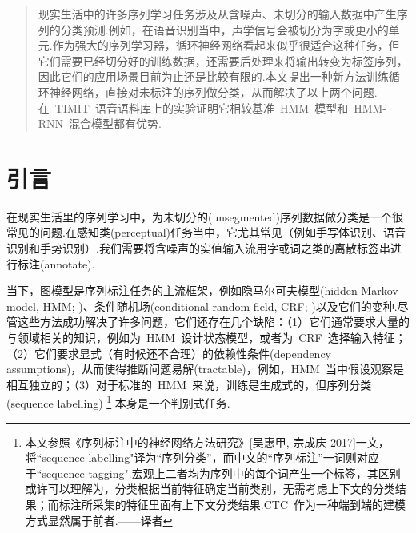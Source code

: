 \documentclass{ctexart}
\begin{document}
 


\printAffiliationsAndNotice{}

\begin{abstract} 
现实生活中的许多序列学习任务涉及从含噪声、未切分的输入数据中产生序列的分类预测.例如，在语音识别当中，声学信号会被切分为字或更小的单元.作为强大的序列学习器，循环神经网络看起来似乎很适合这种任务，但它们需要已经切分好的训练数据，还需要后处理来将输出转变为标签序列，因此它们的应用场景目前为止还是比较有限的.本文提出一种新方法训练循环神经网络，直接对未标注的序列做分类，从而解决了以上两个问题.在~TIMIT~语音语料库上的实验证明它相较基准~HMM~模型和~HMM-RNN~混合模型都有优势.
\end{abstract} 

\section{引言}
\label{sec:intro}
在现实生活里的序列学习中，为未切分的(unsegmented)序列数据做分类是一个很常见的问题.在感知类(perceptual)任务当中，它尤其常见（例如手写体识别、语音识别和手势识别）.我们需要将含噪声的实值输入流用字或词之类的离散标签串进行标注(annotate).

当下，图模型是序列标注任务的主流框架，例如隐马尔可夫模型(hidden Markov model, HMM; \citealp{rabiner1989tutorial})、条件随机场(conditional random field, CRF; \citealp{lafferty2001conditional})以及它们的变种.尽管这些方法成功解决了许多问题，它们还存在几个缺陷：（1）它们通常要求大量的与领域相关的知识，例如为~HMM~设计状态模型，或者为~CRF~选择输入特征；（2）它们要求显式（有时候还不合理）的依赖性条件(dependency assumptions)，从而使得推断问题易解(tractable)，例如，HMM~当中假设观察是相互独立的；（3）对于标准的~HMM~来说，训练是生成式的，但序列分类(sequence labelling)
\footnote{本文参照《序列标注中的神经网络方法研究》[吴惠甲, 宗成庆 2017]一文，将``sequence labelling"译为“序列分类”，而中文的“序列标注”一词则对应于``sequence tagging".宏观上二者均为序列中的每个词产生一个标签，其区别或许可以理解为，分类根据当前特征确定当前类别，无需考虑上下文的分类结果；而标注所采集的特征里面有上下文分类结果.CTC~作为一种端到端的建模方式显然属于前者.——译者}
本身是一个判别式任务.
\end{document}
